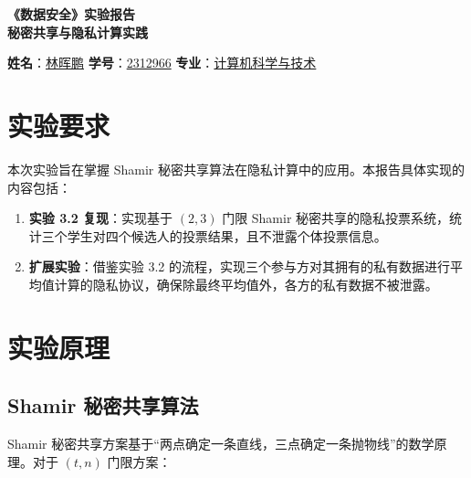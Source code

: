 \documentclass[a4paper]{article}
\begin{document}
\renewcommand{\contentsname}{目\ 录}
\renewcommand{\appendixname}{附录}
\renewcommand{\appendixpagename}{附录}
\renewcommand{\refname}{参考文献} 
\renewcommand{\figurename}{图}
\renewcommand{\tablename}{表}
\renewcommand{\today}{\number\year 年 \number\month 月 \number\day 日}


\renewcommand {\thefigure}{\thesection{}.\arabic{figure}}

\newpage
\begin{center}
    \huge{\textbf{《数据安全》实验报告}}\\
    \vspace {0.5em}
    \Large {\textbf {秘密共享与隐私计算实践}}
\end{center}

\begin{center}
    \textbf{姓名}：\underline{林晖鹏} \quad
    \textbf{学号}：\underline{2312966} \quad
    \textbf{专业}：\underline{计算机科学与技术}
\end{center}

\vspace{1em} 

\tableofcontents

\newpage

\section{实验要求}
本次实验旨在掌握 Shamir 秘密共享算法在隐私计算中的应用。本报告具体实现的内容包括：
\begin{enumerate}
    \item \textbf{实验 3.2 复现}：实现基于 $(2,3)$ 门限 Shamir 秘密共享的隐私投票系统，统计三个学生对四个候选人的投票结果，且不泄露个体投票信息。
    \item \textbf{扩展实验}：借鉴实验 3.2 的流程，实现三个参与方对其拥有的私有数据进行平均值计算的隐私协议，确保除最终平均值外，各方的私有数据不被泄露。
\end{enumerate}

\section{实验原理}
\subsection{Shamir 秘密共享算法}
Shamir 秘密共享方案基于“两点确定一条直线，三点确定一条抛物线”的数学原理。对于 $(t, n)$ 门限方案：
\end{document}
